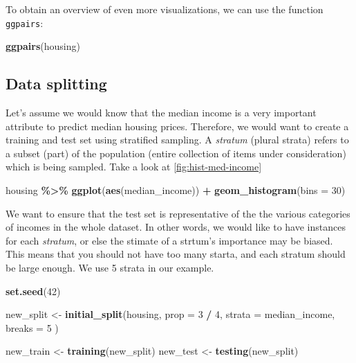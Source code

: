 \documentclass[
]{book}
\newenvironment{Shaded}{\begin{snugshade}}{\end{snugshade}}
\newcommand{\DataTypeTok}[1]{\textcolor[rgb]{0.13,0.29,0.53}{#1}}
\newcommand{\DecValTok}[1]{\textcolor[rgb]{0.00,0.00,0.81}{#1}}
\newcommand{\KeywordTok}[1]{\textcolor[rgb]{0.13,0.29,0.53}{\textbf{#1}}}
\newcommand{\NormalTok}[1]{#1}
\newcommand{\OperatorTok}[1]{\textcolor[rgb]{0.81,0.36,0.00}{\textbf{#1}}}
\newcommand{\StringTok}[1]{\textcolor[rgb]{0.31,0.60,0.02}{#1}}
\begin{document}
To obtain an overview of even more visualizations, we can use the function \texttt{ggpairs}:

\begin{Shaded}
\begin{Highlighting}[]
\KeywordTok{ggpairs}\NormalTok{(housing)}
\end{Highlighting}
\end{Shaded}

\hypertarget{data-splitting}{%
\subsection{Data splitting}\label{data-splitting}}

Let's assume we would know that the median income is a very important attribute to predict median housing prices. Therefore, we would want to create a training and test set using stratified sampling. A \emph{stratum} (plural strata) refers to a subset (part) of the population (entire collection of items under consideration) which is being sampled. Take a look at \ref{fig:hist-med-income}

\begin{Shaded}
\begin{Highlighting}[]
\NormalTok{housing }\OperatorTok{\%\textgreater{}\%}
\StringTok{  }\KeywordTok{ggplot}\NormalTok{(}\KeywordTok{aes}\NormalTok{(median\_income)) }\OperatorTok{+}
\StringTok{  }\KeywordTok{geom\_histogram}\NormalTok{(}\DataTypeTok{bins =} \DecValTok{30}\NormalTok{)}
\end{Highlighting}
\end{Shaded}

We want to ensure that the test set is representative of the the various categories of incomes in the whole dataset. In other words, we would like to have instances for each \emph{stratum}, or else the stimate of a strtum's importance may be biased. This means that you should not have too many starta, and each stratum should be large enough. We use 5 strata in our example.

\begin{Shaded}
\begin{Highlighting}[]
\KeywordTok{set.seed}\NormalTok{(}\DecValTok{42}\NormalTok{)}

\NormalTok{new\_split \textless{}{-}}\StringTok{ }\KeywordTok{initial\_split}\NormalTok{(housing,}
  \DataTypeTok{prop =} \DecValTok{3} \OperatorTok{/}\StringTok{ }\DecValTok{4}\NormalTok{,}
  \DataTypeTok{strata =}\NormalTok{ median\_income,}
  \DataTypeTok{breaks =} \DecValTok{5}
\NormalTok{)}

\NormalTok{new\_train \textless{}{-}}\StringTok{ }\KeywordTok{training}\NormalTok{(new\_split)}
\NormalTok{new\_test \textless{}{-}}\StringTok{ }\KeywordTok{testing}\NormalTok{(new\_split)}
\end{Highlighting}
\end{Shaded}
\end{document}
